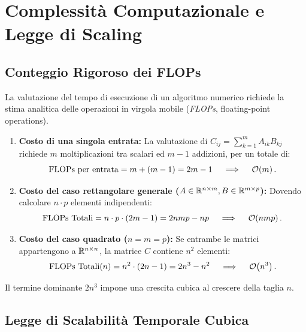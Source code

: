 \FloatBarrier
\section{Complessit\`a Computazionale e Legge di Scaling}

\subsection{Conteggio Rigoroso dei FLOPs}

La valutazione del tempo di esecuzione di un algoritmo numerico richiede la stima analitica delle operazioni in virgola mobile (\textit{FLOPs}, floating-point operations).

\begin{property}
\mbox{}\par\nopagebreak
\begin{enumerate}
    \item \textbf{Costo di una singola entrata:}
    La valutazione di $C_{ij} = \sum_{k=1}^m A_{ik} B_{kj}$ richiede $m$ moltiplicazioni tra scalari ed $m - 1$ addizioni, per un totale di:
    \begin{equation}
        \text{FLOPs per entrata} = m + (m - 1) = 2m - 1 \quad \implies \quad \mathcal{O}\!\left(m\right).
    \end{equation}
    \item \textbf{Costo del caso rettangolare generale ($A \in \mathbb{R}^{n \times m}, B \in \mathbb{R}^{m \times p}$):}
    Dovendo calcolare $n \cdot p$ elementi indipendenti:
    \begin{equation}
        \text{FLOPs Totali} = n \cdot p \cdot (2m - 1) = 2nmp - np \quad \implies \quad \mathcal{O}\!\left(nmp\right).
    \end{equation}
    \item \textbf{Costo del caso quadrato ($n = m = p$):}
    Se entrambe le matrici appartengono a $\mathbb{R}^{n \times n}$, la matrice $C$ contiene $n^2$ elementi:
    \begin{equation}
        \text{FLOPs Totali}(n) = n^2 \cdot (2n - 1) = 2n^3 - n^2 \quad \implies \quad \mathcal{O}\!\left(n^3\right).
    \end{equation}
\end{enumerate}
\end{property}

Il termine dominante $2n^3$ impone una crescita cubica al crescere della taglia $n$.

\subsection{Legge di Scalabilit\`a Temporale Cubica}

